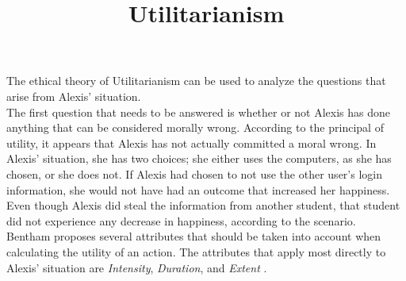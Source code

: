 \documentclass{paper}
\title{Utilitarianism}
\date{}
\author{}
\begin{document}
\drafth{}
\inlinetitle

The ethical theory of Utilitarianism can be used to analyze the questions that arise from Alexis'
situation.\\

The first question that needs to be answered is whether or not Alexis has done anything that can be
considered morally wrong. According to the principal of utility, it appears that Alexis has not actually
committed a moral wrong. In Alexis' situation, she has two choices; she either uses the computers, as she
has chosen, or she does not. If Alexis had chosen to not use the other user's login information, she would
not have had an outcome that increased her happiness. Even though Alexis did steal the information from
another student, that student did not experience any decrease in happiness, according to the scenario.\\

Bentham proposes several attributes that should be taken into account when calculating the utility of an
action. The attributes that apply most directly to Alexis' situation are \textit{Intensity},
\textit{Duration}, and \textit{Extent} \cite{ethics}.

\newpage
\printbibliography
\end{document}
